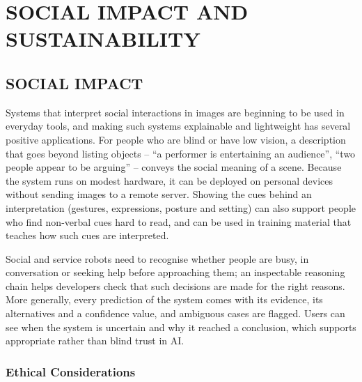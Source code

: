 
\chapter{SOCIAL IMPACT AND SUSTAINABILITY}
\label{ch:impact}

\section{SOCIAL IMPACT}

Systems that interpret social interactions in images are beginning to be used in everyday tools, and making such systems explainable and lightweight has several positive applications. For people who are blind or have low vision, a description that goes beyond listing objects -- ``a performer is entertaining an audience'', ``two people appear to be arguing'' -- conveys the social meaning of a scene. Because the system runs on modest hardware, it can be deployed on personal devices without sending images to a remote server. Showing the cues behind an interpretation (gestures, expressions, posture and setting) can also support people who find non-verbal cues hard to read, and can be used in training material that teaches how such cues are interpreted.

Social and service robots need to recognise whether people are busy, in conversation or seeking help before approaching them; an inspectable reasoning chain helps developers check that such decisions are made for the right reasons. More generally, every prediction of the system comes with its evidence, its alternatives and a confidence value, and ambiguous cases are flagged. Users can see when the system is uncertain and why it reached a conclusion, which supports appropriate rather than blind trust in AI.

\subsection{Ethical Considerations}

